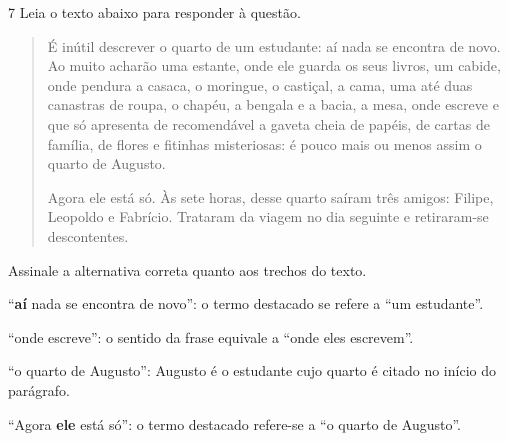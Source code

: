 \num{7} Leia o texto abaixo para responder à questão.


\begin{quote}

É inútil descrever o quarto de um estudante: aí nada se
encontra de novo. Ao muito acharão uma estante, onde ele guarda
os seus livros, um cabide, onde pendura a casaca, o moringue, o
castiçal, a cama, uma até duas canastras de roupa, o chapéu, a
bengala e a bacia, a mesa, onde escreve e que só apresenta de
recomendável a gaveta cheia de papéis, de cartas de família, de
flores e fitinhas misteriosas: é pouco mais ou menos assim o
quarto de Augusto.

Agora ele está só. Às sete horas, desse quarto saíram três
amigos: Filipe, Leopoldo e Fabrício. Trataram da viagem no dia 
seguinte e retiraram-se descontentes.

\end{quote}


Assinale a alternativa correta quanto aos trechos do texto.

\begin{escolha}
    
    \item ``\textbf{aí} nada se encontra de novo'': o termo destacado se refere a ``um estudante''.
    
    \item ``onde escreve'': o sentido da frase equivale a ``onde eles escrevem''.  
    
    \item ``o quarto de Augusto'': Augusto é o estudante cujo quarto é citado no início do parágrafo.  
    
    \item ``Agora \textbf{ele} está só'': o termo destacado refere-se a ``o quarto de Augusto''.   

\end{escolha}

\pagebreak

